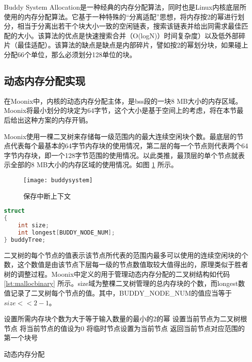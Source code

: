 Buddy System Allocation是一种经典的内存分配算法\cite{DBLP:journals/acta/BrodalDM05}，同时也是Linux内核底层所使用的内存分配算法。它基于一种特殊的“分离适配”思想，将内存按2的幂进行划分，相当于分离出若干个块大小一致的空闲链表，搜索该链表并给出同需求最佳匹配的大小。该算法的优点是快速搜索合并（O(logN)）时间复杂度）以及低外部碎片（最佳适配）。该算法的缺点是缺点是内部碎片，譬如按2的幂划分块，如果碰上分配66个单位，那么必须划分128单位的块。

\subsection{动态内存分配实现}

在Moonix中，内核的动态内存分配主体，是bss段的一块8 MB大小的内存区域。Moonix将最小划分的块定为64字节，这个大小是基于空间上的考虑，将在本节最后给出这种方案的内存开销。

Moonix使用一棵二叉树来存储每一级范围内的最大连续空闲块个数。最底层的节点代表每个最基本的64字节内存块的使用情况，第二层的每一个节点则代表两个64字节内存块，即一个128字节范围的使用情况。以此类推，最顶层的单个节点就表示全部的8 MB大小的内存区域的使用情况。如图 \ref{pic:buddysystem} 所示。

\begin{figure}[htpb]
	\centering
	\texttt{[image: buddysystem]}
	\setlength{\abovecaptionskip}{2pt}
	\caption{保存中断上下文}
	\label{pic:buddysystem}
\end{figure}

\begin{lstlisting}[language={C}, caption={动态内存分配管理二叉树}, label={lst:mallocbinary}]
struct
{
	int size;
	int longest[BUDDY_NODE_NUM];
} buddyTree;
\end{lstlisting}

二叉树的每个节点的值表示该节点所代表的范围内最多可以使用的连续空闲块的个数，这个数值是由该节点下层每一级的节点数值取较大值得出的，原理类似于胜者树的调整过程。Moonix中定义的用于管理动态内存分配的二叉树结构如代码 \ref{lst:mallocbinary} 所示。size域为整棵二叉树管理的总内存块的个数，而longest数值记录了二叉树每个节点的值。其中，BUDDY\_NODE\_NUM的值应当等于$size<<2-1$。

\begin{algorithm}[H]
	
	设置所需内存块个数为大于等于输入数量的最小的2的幂\;
	设置当前节点为二叉树根节点\;
	将当前节点的值设为0\;
	将临时节点设置为当前节点\;
	返回当前节点对应范围的第一个块号\;
	\caption{动态内存分配}
	\label{alg:kalloc}
\end{algorithm}

